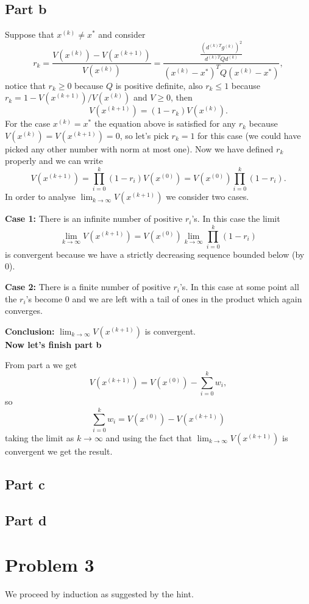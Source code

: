 \documentclass{article}
\begin{document}
\subsection*{Part b}
Suppose that $x^{(k)}\neq x^*$ and consider
\[
r_k=\frac{V(x^{(k)}) -V(x^{(k+1)})}{V(x^{(k)})}
=\frac{\frac{\left(d^{(k)T}g^{(k)}\right)^2}{d^{(k)T}Qd^{(k)}}}{(x^{(k)}-x^*)^TQ(x^{(k)}-x^*)},
\]
notice that $r_k\geq0$ because $Q$ is positive definite, also $r_k\leq 1$ because\\
$r_k=1-V(x^{(k+1)})/V(x^{(k)})$ and $V\geq 0$, then
\[
V(x^{(k+1)})=(1-r_k)V(x^{(k)}).
\]
For the case $x^{(k)}=x^*$ the equation above is satisfied for any $r_k$
because $V(x^{(k)})=V(x^{(k+1)})=0$, so let's pick $r_k=1$ for this case (we
could have picked any other number with norm at most one). Now we have defined
$r_k$ properly and we can write
\[
V(x^{(k+1)})=\prod_{i=0}^k(1-r_i)V(x^{(0)})=V(x^{(0)})\prod_{i=0}^k(1-r_i).
\]
In order to analyse $\lim_{k\to\infty}V(x^{(k+1)})$ we consider two cases.

\textbf{Case 1:} There is an infinite number of positive $r_i$'s. In this case
the limit
\[
	\lim_{k\to\infty}V(x^{(k+1)})=V(x^{(0)})\lim_{k\to\infty}\prod_{i=0}^k(1-r_i)
\]
is convergent because we have a strictly decreasing sequence bounded below (by
0).

\textbf{Case 2:} There is a finite number of positive $r_i$'s. In this case at
some point all the $r_i$'s become 0 and we are left with a tail of ones in the
product which again converges.

\textbf{Conclusion:} $\lim_{k\to\infty}V(x^{(k+1)})$ is convergent.\\
\textbf{Now let's finish part b}

From part a we get
\[
V(x^{(k+1)})=V(x^{(0)})-\sum_{i=0}^kw_i,
\]
so
\[
\sum_{i=0}^kw_i=V(x^{(0)})-V(x^{(k+1)})
\]
taking the limit as $k\to\infty$ and using the fact that
$\lim_{k\to\infty}V(x^{(k+1)})$ is convergent we get the result.
\subsection*{Part c}
\subsection*{Part d}
\section*{Problem 3}
We proceed by induction as suggested by the hint.
\end{document}
